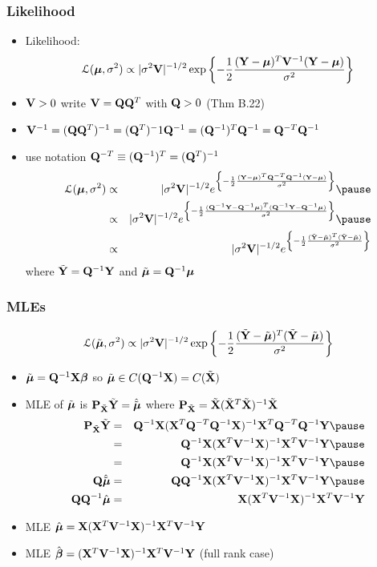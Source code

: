 \documentclass[]{beamer}
\begin{document}
\begin{frame}
  \frametitle{Likelihood}
  \begin{itemize}
  \item Likelihood:  
$$ {\cal{L}}(\boldsymbol{\mu}, \sigma^2) \propto | \sigma^2 \mathbf{V} |^{-1/2} 
\exp \left\{  - \frac 1 2 \frac{(\mathbf{Y} - \boldsymbol{\mu})^T\mathbf{V}^{-1} (\mathbf{Y} - \boldsymbol{\mu}) }{\sigma^2} \right\}
$$  \pause
\item $\mathbf{V} > 0$ write $\mathbf{V} = \mathbf{Q} \mathbf{Q}^T$  with $\mathbf{Q} > 0$ (Thm  B.22) \pause
\item $\mathbf{V}^{-1} = (\mathbf{Q} \mathbf{Q}^T)^{-1} = (\mathbf{Q}^T)^-1 \mathbf{Q}^{-1} = (\mathbf{Q}^{-1})^T
  \mathbf{Q}^{-1} = \mathbf{Q}^{-T} \mathbf{Q}^{-1}$ \pause
\item use notation $\mathbf{Q}^{-T} \equiv (\mathbf{Q}^{-1})^T = (\mathbf{Q}^T)^{-1}$ \pause
  \begin{eqnarray*}
\cL(\mub, \sigma^2) & \propto & | \sigma^2 \V |^{-1/2} 
e^{ \left\{  - \frac 1 2 \frac{(\Y - \mub)^T\Q^{-T} \Q^{-1}(\Y -
    \mub) }{\sigma^2} \right\}} \pause  \\ 
& \propto & | \sigma^2 \V |^{-1/2} 
e^{\left\{  - \frac 1 2 \frac{(\Q^{-1}\Y - \Q^{-1}\mub)^T (\Q^{-1}\Y -
    \Q^{-1}\mub) }{\sigma^2} \right\}}\pause \\
& \propto & | \sigma^2 \V |^{-1/2} 
e^{\left\{  - \frac 1 2 \frac{(\tY - \tmub)^T (\tY -
    \tmub) }{\sigma^2} \right\}} \\
  \end{eqnarray*}
where $\tilde{\mathbf{Y}} = \mathbf{Q}^{-1} \mathbf{Y}$ and  $\tilde{\boldsymbol{\mu}} = \mathbf{Q}^{-1} \boldsymbol{\mu}$
 \end{itemize}
\end{frame}
\begin{frame}
  \frametitle{MLEs}
$${\cal{L}}(\tilde{\boldsymbol{\mu}}, \sigma^2) \propto  | \sigma^2 \mathbf{V} |^{-1/2} 
\exp{\left\{  - \frac 1 2 \frac{(\tilde{\mathbf{Y}}- \tilde{\boldsymbol{\mu}})^T (\tilde{\mathbf{Y}}-
    \tilde{\boldsymbol{\mu}}) }{\sigma^2} \right\}}
$$  
\begin{itemize}
  \item $\tilde{\boldsymbol{\mu}} = \mathbf{Q}^{-1} \mathbf{X} \boldsymbol{\beta}$ so $\tilde{\boldsymbol{\mu}} \in C(\mathbf{Q}^{-1}\mathbf{X}) = C(\tilde{\mathbf{X}})$  \pause
  \item MLE of $\tilde{\boldsymbol{\mu}}$ is $\mathbf{P}_{\tilde{\mathbf{X}}} \tilde{\mathbf{Y}} = \hat{\tilde{\boldsymbol{\mu}}}$ where $\mathbf{P}_{\tilde{\mathbf{X}}} =
    \tilde{\mathbf{X}}(\tilde{\mathbf{X}}^T\tilde{\mathbf{X}})^{-1} \tilde{\mathbf{X}}$ \pause
    \begin{eqnarray*}
\P_{\tX}\tY  & = & \Q^{-1} \X (\X^T\Q^{-T}\Q^{-1} \X)^{-1} \X^T
\Q^{-T} \Q^{-1} \Y    \pause  \\
  & = &  \Q^{-1} \X (\X^T \V^{-1} \X)^{-1} \X^T \V^{-1} \Y \pause  \\
  & = &\Q^{-1} \X (\X^T \V^{-1} \X)^{-1} \X^T \V^{-1} \Y \pause  \\
\Q \hat{\tmub} & = & \Q \Q^{-1}\X (\X^T \V^{-1} \X)^{-1} \X^T \V^{-1}
\Y \pause  \\
\Q \Q^{-1} \muhat & = &\X (\X^T \V^{-1} \X)^{-1} \X^T \V^{-1}
\Y  
    \end{eqnarray*}
\pause 
\item MLE $\hat{\boldsymbol{\mu}} = \mathbf{X} (\mathbf{X}^T \mathbf{V}^{-1} \mathbf{X})^{-1} \mathbf{X}^T \mathbf{V}^{-1}
\mathbf{Y} $ \pause 
\item MLE $\hat{\boldsymbol{\beta}} = (\mathbf{X}^T \mathbf{V}^{-1} \mathbf{X})^{-1} \mathbf{X}^T \mathbf{V}^{-1}\mathbf{Y}$ (full rank case)
  \end{itemize}
\end{frame}
\end{document}
